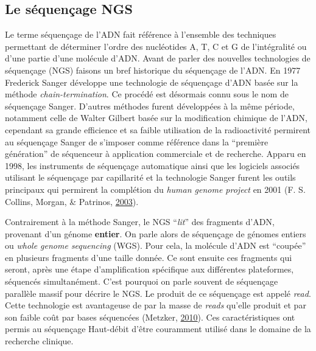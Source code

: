 \documentclass[12pt,twoside]{reedthesis}
\theoremstyle{definition}
\theoremstyle{definition}
\theoremstyle{remark}
\begin{document}
  \newpage
  
  \hypertarget{ngs}{\subsection{Le séquençage NGS}\label{ngs}}
  
  Le terme séquençage de l'ADN fait référence à l'ensemble des techniques
  permettant de déterminer l'ordre des nucléotides A, T, C et G de
  l'intégralité ou d'une partie d'une molécule d'ADN. Avant de parler des
  nouvelles technologies de séquençage (NGS) faisons un bref historique du
  séquençage de l'ADN. En 1977 Frederick Sanger développe une technologie
  de séquençage d'ADN basée sur la méthode \emph{chain-termination}. Ce
  procédé est désormais connu sous le nom de séquençage Sanger. D'autres
  méthodes furent développées à la même période, notamment celle de Walter
  Gilbert basée sur la modification chimique de l'ADN, cependant sa grande
  efficience et sa faible utilisation de la radioactivité permirent au
  séquençage Sanger de s'imposer comme référence dans la ``première
  génération'' de séquenceur à application commerciale et de recherche.
  Apparu en 1998, les instruments de séquençage automatique ainsi que les
  logiciels associés utilisant le séquençage par capillarité et la
  technologie Sanger furent les outils principaux qui permirent la
  complétion du \emph{human genome project} en 2001 (F. S. Collins,
  Morgan, \& Patrinos, \protect\hyperlink{ref-Collins2003}{2003}).
  
  Contrairement à la méthode Sanger, le NGS ``\emph{lit}'' des fragments
  d'ADN, provenant d'un génome \textbf{entier}. On parle alors de
  séquençage de génomes entiers ou \emph{whole genome sequencing} (WGS).
  Pour cela, la molécule d'ADN est ``coupée'' en plusieurs fragments d'une
  taille donnée. Ce sont ensuite ces fragments qui seront, après une étape
  d'amplification spécifique aux différentes plateformes, séquencés
  simultanément. C'est pourquoi on parle souvent de séquençage parallèle
  massif pour décrire le NGS. Le produit de ce séquençage est appelé
  \emph{read}. Cette technologie est avantageuse de par la masse de
  \emph{reads} qu'elle produit et par son faible coût par bases séquencées
  (Metzker, \protect\hyperlink{ref-Metzker2010}{2010}). Ces
  caractéristiques ont permis au séquençage Haut-débit d'être couramment
  utilisé dans le domaine de la recherche clinique.
  
\end{document}
